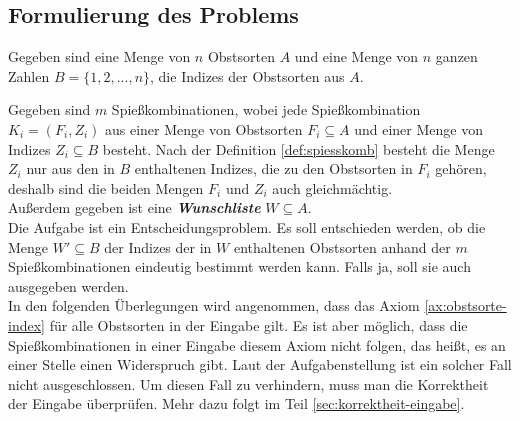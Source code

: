 \subsection{Formulierung des Problems}\label{sec:formulierung}
Gegeben sind eine Menge von $n$ Obstsorten $A$ und eine Menge von $n$ ganzen Zahlen
$B = \{1, 2, ..., n\}$, die Indizes der Obstsorten aus $A$.





Gegeben sind $m$ Spießkombinationen, wobei jede Spießkombination $K_i = (F_i, Z_i)$
aus einer Menge von Obstsorten $F_i \subseteq A$ und einer Menge von Indizes $Z_i \subseteq B$ besteht. 
Nach der Definition \ref{def:spiesskomb} besteht die Menge $Z_i$ nur aus
den in $B$ enthaltenen Indizes, die zu den Obstsorten in $F_i$ gehören, deshalb sind die beiden Mengen
$F_i$ und $Z_i$ auch gleichmächtig.\\
\indent Außerdem gegeben ist eine \textit{\textbf{Wunschliste}} $W \subseteq A$.\\

Die Aufgabe ist ein Entscheidungsproblem. Es soll entschieden werden,
ob die Menge $W' \subseteq B$ der Indizes der in $W$ enthaltenen Obstsorten anhand der $m$ 
Spießkombinationen eindeutig bestimmt werden kann. Falls ja, soll sie auch ausgegeben werden.\\

In den folgenden Überlegungen wird angenommen, dass das Axiom \ref{ax:obstsorte-index} für alle
Obstsorten in der Eingabe gilt.
Es ist aber möglich, dass die Spießkombinationen in einer Eingabe diesem Axiom nicht folgen, das heißt,
es an einer Stelle einen Widerspruch gibt.
Laut der Aufgabenstellung ist ein solcher Fall nicht ausgeschlossen. 
Um diesen Fall zu verhindern, muss man die Korrektheit der Eingabe überprüfen. 
Mehr dazu folgt im Teil \ref{sec:korrektheit-eingabe}.
